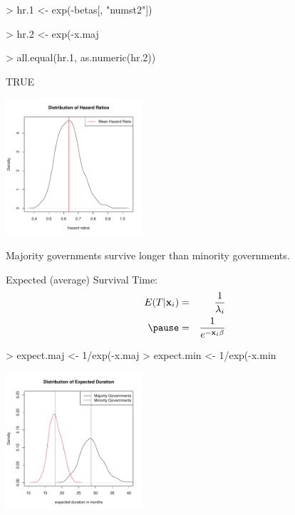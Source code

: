 \documentclass[handout]{beamer}
\begin{document}
\begin{frame}[fragile]
\tiny
\begin{Schunk}
\begin{Sinput}
> hr.1 <- exp(-betas[, "numst2"])
\end{Sinput}
\end{Schunk}
\pause
\begin{Schunk}
\begin{Sinput}
> hr.2 <- exp(-x.maj %
\end{Sinput}
\end{Schunk}
\pause
\begin{Schunk}
\begin{Sinput}
> all.equal(hr.1, as.numeric(hr.2))
\end{Sinput}
\begin{Soutput}
[1] TRUE
\end{Soutput}
\end{Schunk}
\pause

\begin{center}
\includegraphics[width = 2in, height = 2in]{survival_present-hr.pdf}
\end{center}
\normalsize
\pause
Majority governments survive longer than minority governments.
\end{frame}

\begin{frame}[fragile]
Expected (average) Survival Time:
\pause
\begin{eqnarray*}
E(T | \mathbf{x}_i) &=& \frac{1}{\lambda_i}\\
\pause
&=& \frac{1}{e^{-\mathbf{x}_i \beta}}
\end{eqnarray*}
\pause
\tiny
\begin{Schunk}
\begin{Sinput}
> expect.maj <- 1/exp(-x.maj %
> expect.min <- 1/exp(-x.min %
\end{Sinput}
\end{Schunk}
\pause
\begin{center}
\includegraphics[width = 2in, height = 2in]{survival_present-expected.pdf}
\end{center}

\end{frame}
\end{document}
